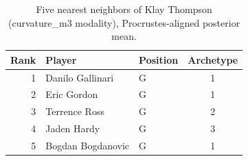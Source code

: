 \begin{table}[htbp]
  \centering\small
  \begin{tabular}{rllc}
    \toprule
    Rank & Player & Position & Archetype \\
    \midrule
    1 & Danilo Gallinari & G & 1 \\
    2 & Eric Gordon & G & 1 \\
    3 & Terrence Ross & G & 2 \\
    4 & Jaden Hardy & G & 3 \\
    5 & Bogdan Bogdanovic & G & 1 \\
    \bottomrule
  \end{tabular}
  \caption{Five nearest neighbors of Klay Thompson (curvature_m3 modality), Procrustes-aligned posterior mean.}
  \label{tab:Klay_Thompson_neighbors_curvature_m3}
\end{table}

